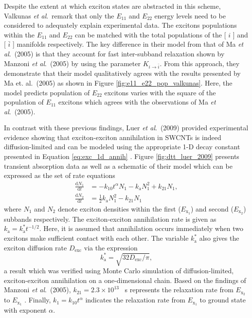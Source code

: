 Despite the extent at which exciton states are abstracted in this scheme, Valkunas \textit{et al}.\ remark that only the $E_{11}$ and $E_{22}$ energy levels need to be considered to adequately explain experimental data. The excitons populations within the $E_{11}$ and $E_{22}$ can be matched with the total populations of the [ $i$ ] and [ $\bar{i}$ ] manifolds respectively. The key difference in their model from that of Ma \textit{et al}.\ (2005) is that they account for fast inter-subband relaxation shown by Manzoni \textit{et al}.\ (2005) by using the parameter $K_{i \rightarrow \bar{i}}$.
From this approach, they demonstrate that their model qualitatively agrees with the results presented by Ma et. al.\ (2005) as shown in Figure \ref{fig:e11_e22_pop_valkunas}. Here, the model predicts population of $E_{22}$ excitons varies with the square of the population of $E_{11}$ excitons which agrees with the observations of Ma \textit{et al}.\ (2005).

In contrast with these previous findings, Luer \textit{et al}.\ (2009) provided experimental evidence showing that exciton-exciton annihilation in SWCNTs is indeed diffusion-limited and can be modeled using the appropriate 1-D decay constant presented in Equation \eqref{eq:exc_1d_annih} \cite{luer2009size}. Figure \ref{fig:dtt_luer_2009} presents transient absorption data as well as a schematic of their model which can be expressed as the set of rate equations
%
\begin{equation}
	\begin{split}
			\frac{\mathrm{d} N_1}{\mathrm{d} t} &= -k_{10} t^{\alpha} N_1 - k_\text{a}N_1^2 + k_{21} N_1,
			\\
			\frac{\mathrm{d} N_2}{\mathrm{d} t} &= \frac{1}{2} k_\text{a} N_1^2 - k_{21} N_1
	\end{split}
\end{equation}
%
where $N_1$ and $N_2$ denote exciton densities within the first ($E_{\text{x}_1}$) and second ($E_{\text{x}_2}$) subbands respectively. The exciton-exciton annihilation rate is given as $k_\text{a} = k_\text{a}^* t^{-1/2}$. Here, it is assumed that annihilation occurs immediately when two excitons make sufficient contact with each other. The variable $k_\text{a}^*$ also gives the exciton diffusion rate $D_\text{exc}$ via the expression
\begin{equation}
	k_\text{a}^* = \sqrt{32 D_\text{exc}/ \pi},
	\label{eq:exc_anih_diffuse_luer_2009}
\end{equation}
a result which was verified using Monte Carlo simulation of diffusion-limited, exciton-exciton annihilation on a one-dimensional chain. Based on the findings of Manzoni \textit{et al}.\ (2005), $k_{21} = 2.3 \times 10^{13}$ \si{\per\second} represents the relaxation rate from $ E_{\text{x}_2} $ to $E_{\text{x}_1}$ \cite{manzoni2005intersubband}. Finally, $k_{1} = k_{10}t^\alpha $ indicates the relaxation rate from $E_{\text{x}_1}$ to ground state with exponent $\alpha$.

